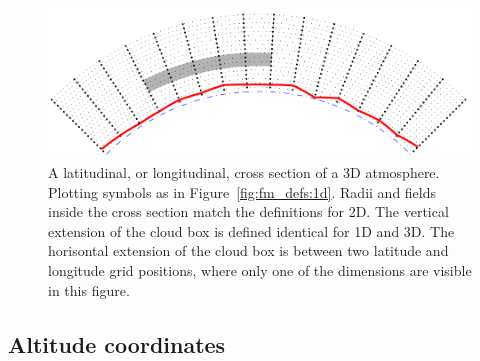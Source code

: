 \begin{figure}[!p]
 \begin{center}
  \includegraphics*[width=0.98\hsize]{Figs/fm_definitions/atm_dim_3dcross}
  \caption{A latitudinal, or longitudinal, cross section of a 3D atmosphere. 
    Plotting symbols as in Figure~\ref{fig:fm_defs:1d}. Radii and
    fields inside the cross section match the definitions for 2D.
    The vertical extension
    of the cloud box is defined identical for 1D and 3D. The horisontal 
    extension of the cloud box is between two latitude and longitude grid
    positions, where only one of the dimensions are visible in this figure.}
  \label{fig:fm_defs:3dcross}
 \end{center}
\end{figure}



\subsection{Altitude coordinates}
\label{sec:fm_defs:altitudes}

